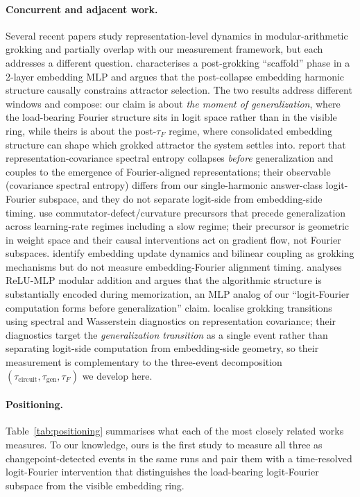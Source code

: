 \documentclass{article}
\newcommand{\taug}{\tau_{\mathrm{gen}}}
\newcommand{\tauf}{\tau_{F}}
\newcommand{\taucirc}{\tau_{\mathrm{circuit}}}
\begin{document}
\paragraph{Concurrent and adjacent work.}
Several recent papers study representation-level dynamics in
modular-arithmetic grokking and partially overlap with our
measurement framework, but each addresses a different question.
\citet{khaliq2026scaffold} characterises a post-grokking
``scaffold'' phase in a 2-layer embedding MLP and argues that the
post-collapse embedding harmonic structure causally constrains
attractor selection. The two results address different windows and
compose: our claim is about \emph{the moment of generalization},
where the load-bearing Fourier structure sits in logit space rather
than in the visible ring, while theirs is about the post-$\tauf$
regime, where consolidated embedding structure can shape which
grokked attractor the system settles into.
\citet{truong2026spectral} report that representation-covariance
spectral entropy collapses \emph{before} generalization and couples
to the emergence of Fourier-aligned representations; their
observable (covariance spectral entropy) differs from our
single-harmonic answer-class logit-Fourier subspace, and they do
not separate logit-side from embedding-side timing.
\citet{xu2026curvature} use commutator-defect/curvature precursors
that precede generalization across learning-rate regimes including
a slow regime; their precursor is geometric in weight space and
their causal interventions act on gradient flow, not Fourier
subspaces.
\citet{alquboj2025embedding} identify embedding update dynamics
and bilinear coupling as grokking mechanisms but do not measure
embedding-Fourier alignment timing.
\citet{swaroop2026latent} analyses ReLU-MLP modular addition and
argues that the algorithmic structure is substantially encoded
during memorization, an MLP analog of our ``logit-Fourier computation
forms before generalization'' claim.
\citet{wang2026transition} localise grokking transitions using
spectral and Wasserstein diagnostics on representation covariance;
their diagnostics target the \emph{generalization transition} as
a single event rather than separating logit-side computation from
embedding-side geometry, so their measurement is complementary to
the three-event decomposition $(\taucirc,\taug,\tauf)$ we develop
here.

\paragraph{Positioning.}
Table~\ref{tab:positioning} summarises what each of the most closely
related works measures.
To our knowledge, ours is the first study to measure all three
as changepoint-detected events in the same runs and pair them with a
time-resolved logit-Fourier intervention that distinguishes the
load-bearing logit-Fourier subspace from the visible embedding ring.
\end{document}
